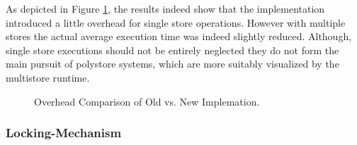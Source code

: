 As depicted in Figure \ref{fig:overhead}, the results indeed show that the implementation introduced a little overhead for single store operations.
However with multiple stores the actual average execution time was indeed slightly reduced. Although, single store executions should not be entirely neglected
they do not form the main pursuit of polystore systems, which are more suitably visualized by the multistore runtime.



\begin{figure}[t] 
    \centering 
\caption{Overhead Comparison of Old vs. New Implemation.}
\label{fig:overhead}
\end{figure}




\subsubsection{Locking-Mechanism} 

